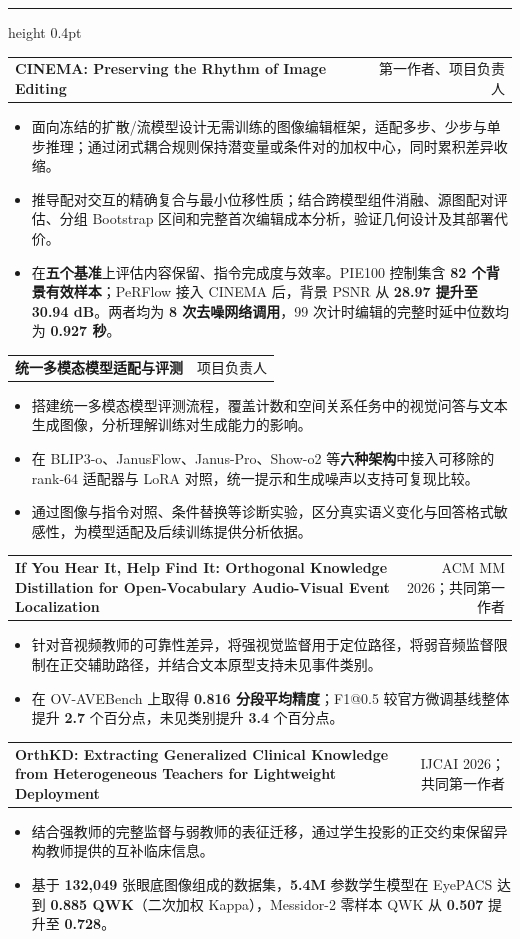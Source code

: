 \documentclass[10pt]{article}
\makeatletter
\newcommand{\cvsection}[2][4]{\par\addvspace{11pt}\Needspace{#1\baselineskip}{\fontsize{13}{15.5}\selectfont\bfseries #2\par}\nobreak\vspace{2pt}\hrule height 0.4pt\nobreak\vspace{5pt}}
\newcommand{\researchentry}[2]{\par\addvspace{6pt}\Needspace{5\baselineskip}\begin{tabularx}{\linewidth}{@{}>{\raggedright\arraybackslash}X@{\hspace{1em}}r@{}}\textbf{#1} & {\small #2}\end{tabularx}\par}
\makeatother
\begin{document}
\newpage
\cvsection{科研经历}
\researchentry{CINEMA: Preserving the Rhythm of Image Editing}{第一作者、项目负责人}
\begin{itemize}
\item 面向冻结的扩散/流模型设计无需训练的图像编辑框架，适配多步、少步与单步推理；通过闭式耦合规则保持潜变量或条件对的加权中心，同时累积差异收缩。
\item 推导配对交互的精确复合与最小位移性质；结合跨模型组件消融、源图配对评估、分组 Bootstrap 区间和完整首次编辑成本分析，验证几何设计及其部署代价。
\item 在\textbf{五个基准}上评估内容保留、指令完成度与效率。PIE100 控制集含 \textbf{82 个背景有效样本}；PeRFlow 接入 CINEMA 后，背景 PSNR 从 \textbf{28.97 提升至 30.94 dB}。两者均为 \textbf{8 次去噪网络调用}，99 次计时编辑的完整时延中位数均为 \textbf{0.927 秒}。
\end{itemize}
\researchentry{统一多模态模型适配与评测}{项目负责人}
\begin{itemize}
\item 搭建统一多模态模型评测流程，覆盖计数和空间关系任务中的视觉问答与文本生成图像，分析理解训练对生成能力的影响。
\item 在 BLIP3-o、JanusFlow、Janus-Pro、Show-o2 等\textbf{六种架构}中接入可移除的 rank-64 适配器与 LoRA 对照，统一提示和生成噪声以支持可复现比较。
\item 通过图像与指令对照、条件替换等诊断实验，区分真实语义变化与回答格式敏感性，为模型适配及后续训练提供分析依据。
\end{itemize}
\researchentry{If You Hear It, Help Find It: Orthogonal Knowledge Distillation for Open-Vocabulary Audio-Visual Event Localization}{ACM MM 2026；共同第一作者}
\begin{itemize}
\item 针对音视频教师的可靠性差异，将强视觉监督用于定位路径，将弱音频监督限制在正交辅助路径，并结合文本原型支持未见事件类别。
\item 在 OV-AVEBench 上取得 \textbf{0.816 分段平均精度}；F1@0.5 较官方微调基线整体提升 \textbf{2.7} 个百分点，未见类别提升 \textbf{3.4} 个百分点。
\end{itemize}
\researchentry{OrthKD: Extracting Generalized Clinical Knowledge from Heterogeneous Teachers for Lightweight Deployment}{IJCAI 2026；共同第一作者}
\begin{itemize}
\item 结合强教师的完整监督与弱教师的表征迁移，通过学生投影的正交约束保留异构教师提供的互补临床信息。
\item 基于 \textbf{132,049} 张眼底图像组成的数据集，\textbf{5.4M} 参数学生模型在 EyePACS 达到 \textbf{0.885 QWK}（二次加权 Kappa），Messidor-2 零样本 QWK 从 \textbf{0.507} 提升至 \textbf{0.728}。
\end{itemize}
\end{document}
